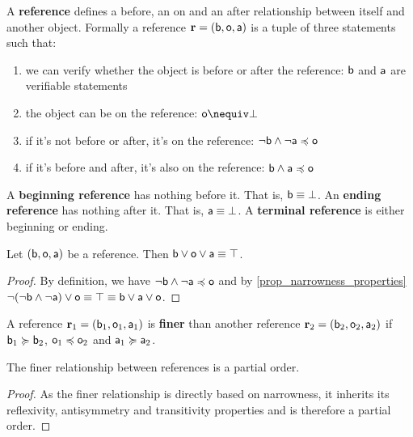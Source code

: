 \documentclass[11pt,letterpaper,fleqn]{memoir} %
\begin{document}
\begin{mathSection}
\begin{defn}
	A \textbf{reference} defines a before, an on and an after relationship between itself and another object. Formally a reference $\refStmt = ( \stmt[b], \stmt[o], \stmt[a] )$ is a tuple of three statements such that:
	\begin{enumerate}
		\item we can verify whether the object is before or after the reference: $\stmt[b]$ and $\stmt[a]$ are verifiable statements
		\item the object can be on the reference: $\stmt[o] \nequiv \impossibility$
		\item if it's not before or after, it's on the reference: $\NOT \stmt[b] \AND \NOT \stmt[a] \narrower \stmt[o]$
		\item if it's before and after, it's also on the reference: $\stmt[b] \AND \stmt[a] \narrower \stmt[o]$
	\end{enumerate}
A \textbf{beginning reference} has nothing before it. That is, $\stmt[b] \equiv \impossibility$. An \textbf{ending reference} has nothing after it. That is, $\stmt[a] \equiv \impossibility$. A \textbf{terminal reference} is either beginning or ending.
\end{defn}
\begin{coro}
	Let $(\stmt[b], \stmt[o], \stmt[a])$ be a reference. Then $\stmt[b] \OR \stmt[o] \OR \stmt[a] \equiv \certainty$.
\end{coro}
\begin{proof}
	By definition, we have $\NOT \stmt[b] \AND \NOT \stmt[a] \narrower \stmt[o]$ and by \ref{prop_narrowness_properties} $\NOT (\NOT \stmt[b] \AND \NOT \stmt[a]) \OR \stmt[o] \equiv \certainty \equiv \stmt[b] \OR \stmt[a] \OR \stmt[o]$.
\end{proof}
\begin{defn}\label{3_def_reference}
	A reference $\refStmt_1 = (\stmt[b]_1, \stmt[o]_1, \stmt[a]_1)$ is \textbf{finer} than another reference $\refStmt_2 = (\stmt[b]_2, \stmt[o]_2, \stmt[a]_2)$ if $\stmt[b]_1 \broader \stmt[b]_2$, $\stmt[o]_1 \narrower \stmt[o]_2$ and $\stmt[a]_1 \broader \stmt[a]_2$.
\end{defn}
\begin{coro}
	The finer relationship between references is a partial order.
\end{coro}
\begin{proof}
	As the finer relationship is directly based on narrowness, it inherits its reflexivity, antisymmetry and transitivity properties and is therefore a partial order.

\end{proof}
\end{mathSection}
\end{document}
